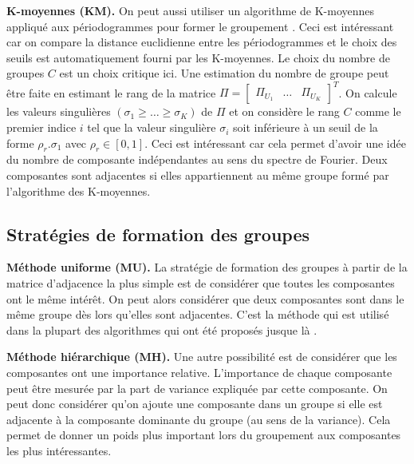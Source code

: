 \documentclass{gretsi}
\newcommand{\val}[3]{(#1_1 #3 \dots #3 #1_#2)}
\newcommand{\inter}{\left[0, 1\right]}
\begin{document}
\noindent\textbf{K-moyennes (KM).}\label{par:KM} 
    On peut aussi utiliser un algorithme de K-moyennes appliqué aux périodogrammes pour former le groupement \cite{alvarez_13_auto}.
    Ceci est intéressant car on compare la distance euclidienne entre les périodogrammes et le choix des seuils est automatiquement fourni par les K-moyennes.
    Le choix du nombre de groupes $C$ est un choix critique ici.
    Une estimation du nombre de groupe peut être faite en estimant le rang de la matrice $\Pi = \begin{bmatrix}\Pi_{U_1}&\dots&\Pi_{U_K}\end{bmatrix}^T$.
    On calcule les valeurs singulières $\val{\sigma}{K}{\ge}$ de $\Pi$ et on considère le rang $C$ comme le premier indice $i$ tel que la valeur singulière $\sigma_i$  soit inférieure à un seuil de la forme $\rho_r.\sigma_1$ avec $\rho_r \in \inter$.
    Ceci est intéressant car cela permet d'avoir une idée du nombre de composante indépendantes au sens du spectre de Fourier.
    Deux composantes sont adjacentes si elles appartiennent au même groupe formé par l'algorithme des K-moyennes.

\vspace{-.2cm}
\subsection{Stratégies de formation des groupes}
\label{sub:clust}
\vspace{-.1cm}
\begin{sloppypar}
\noindent\textbf{Méthode uniforme (MU).}
    La stratégie de formation des groupes à partir de la matrice d'adjacence la plus simple est de considérer que toutes les composantes ont le même intérêt.
    On peut alors considérer que deux composantes sont dans le même groupe dès lors qu'elles sont adjacentes.
    C'est la méthode qui est utilisé dans la plupart des algorithmes qui ont été proposés jusque là \cite{abalov_14_auto, alvarez_13_auto}.
\end{sloppypar}


\begin{sloppypar}
\noindent\textbf{Méthode hiérarchique (MH).}
    Une autre possibilité est de considérer que les composantes ont une importance relative.
    L'importance de chaque composante peut être mesurée par la part de variance expliquée par cette composante.
    On peut donc considérer qu'on ajoute une composante dans un groupe si elle est adjacente à la composante dominante du groupe (au sens de la variance).
    Cela permet de donner un poids plus important lors du groupement aux composantes les plus intéressantes.
\end{sloppypar}
\vspace{-.2cm}
\end{document}
